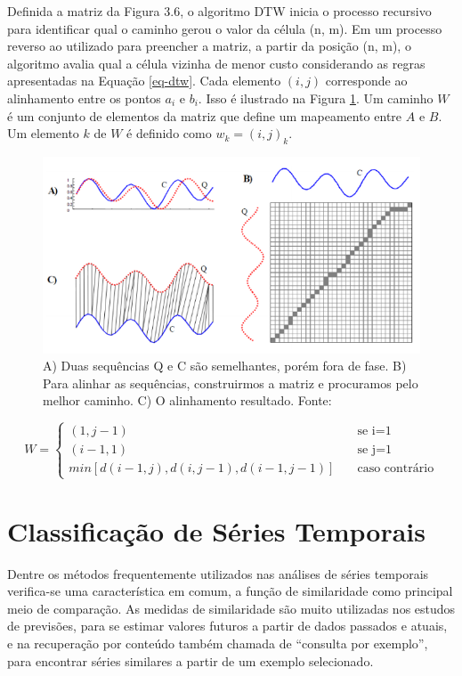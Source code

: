 Definida a matriz da Figura 3.6, o algoritmo DTW inicia o processo recursivo para identificar qual o caminho gerou o valor da célula (n, m). Em um processo reverso ao utilizado para preencher a matriz, a partir da posição (n, m), o algoritmo avalia qual a célula vizinha de menor custo considerando as regras apresentadas na Equação \ref{eq-dtw}. Cada elemento $(i,j)$ corresponde ao alinhamento entre os pontos $a_i$ e $b_i$. Isso é ilustrado na Figura \ref{fig-dtw}. Um caminho $W$ é um conjunto de elementos da matriz que define um mapeamento entre $A$ e $B$. Um elemento $k$ de $W$ é definido como $w_k = (i,j)_k$.


\begin{figure}[H]
	\centering
	\includegraphics[scale=0.6]{pasta1_figuras/fig-dtw.png}
	\caption {A) Duas sequências Q e C são semelhantes, porém fora de fase. B) Para alinhar as sequências, construirmos a matriz e procuramos pelo melhor caminho. C) O alinhamento resultado. Fonte: \cite{Keogh2005}}
	\label{fig-dtw}
\end{figure}



\begin{equation} \label{eq-dtw}
W=
\begin{cases}
(1,j-1)   & \quad \text{se i=1}\\
(i-1,1)   & \quad \text{se j=1} \\
min[d(i-1,j),d(i,j-1),d(i-1,j-1)] & \quad \text{caso contrário}
\end{cases}
\end{equation}

 
\section{Classificação de Séries Temporais}

Dentre os métodos frequentemente utilizados nas análises de séries temporais verifica-se uma característica em comum, a função de similaridade como principal meio de comparação. As medidas de similaridade são muito utilizadas nos estudos de previsões, para se estimar valores futuros a partir de dados passados e atuais, e na recuperação por conteúdo também chamada de “consulta por exemplo”, para encontrar séries similares a partir de um exemplo selecionado. \cite{Sorjamaa:2007}

